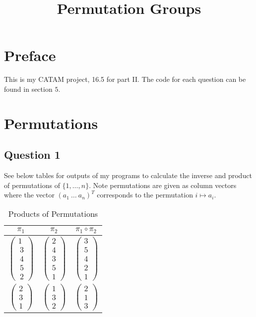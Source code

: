 \documentclass{article}
\begin{document}
\title{Permutation Groups}
\maketitle
\tableofcontents
\newpage
\section*{Preface}
This is my CATAM project,  16.5 for part II. The code for each question can be found in section $5$.
\newpage
\section{Permutations}
\subsection{Question 1}
See below tables for outputs of my programs to calculate the inverse and product of permutations of $\{1,\ldots,n\}$. Note permutations are given as column vectors where the vector $(a_1\ \ldots\ a_n)^T$ corresponds to the permutation $i\mapsto a_i$. 

\begin{table}[hp]
\begin{center}
\begin{tabular}{|c|c|c|}
\hline
$\pi_1$           & $\pi_2$             & $\pi_1\circ \pi_2$ \\ \hline
$\begin{pmatrix} 1\\\ 3\\\ 4\\\ 5\\\ 2\end{pmatrix}$ & $\begin{pmatrix} 2\\  4\\  3 \\  5 \\  1\end{pmatrix} $ & $\begin{pmatrix} 3\\  5\\  4\\  2\\  1\end{pmatrix} $  \\
$\begin{pmatrix} 2\\  3\\  1\end{pmatrix} $       & $\begin{pmatrix} 1\\  3\\  2\end{pmatrix} $         & $\begin{pmatrix} 2\\  1\\  3\end{pmatrix} $        \\ \hline
\end{tabular}
\caption{Products of Permutations}
\end{center}
\end{table}
\end{document}
